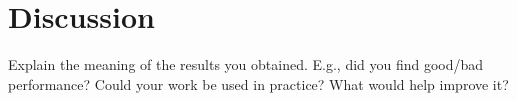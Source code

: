 \section{Discussion}
\label{sec:dis}
Explain the meaning of the results you obtained. E.g., did you find good/bad performance? Could your work be used in practice? What would help improve it?